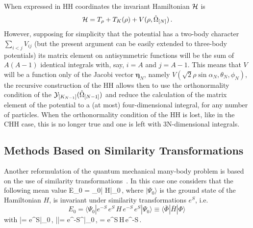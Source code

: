 When expressed in HH coordinates the invariant Hamiltonian $\cal H$ is
\begin{equation}
 {\cal H}=   T_\rho + T_K(\rho) + V(\rho, \hat\Omega_{[N]})\,.
\end{equation}
However, supposing for simplicity that the potential has a two-body character $\sum_{i<j} V_{ij}$
(but the present argument can be easily extended to three-body potentials) its matrix element 
on antisymmetric functions will be the sum of $A(A-1)$ identical integrals 
with, say, $i=A$ and $j=A-1$. This means that $V$  will be a function only of the Jacobi vector $\bm{\eta}_N$, namely
$V(\sqrt{2}\rho \sin \alpha_N, \theta_N,\phi_N)$, 
the recursive  construction of the HH allows then to use the orthonormality condition 
of the ${\cal Y}_{[K_{N-1}]}(\hat\Omega_{[N-1]})$ and reduce the calculation of the matrix element of the potential 
to a (at most) four-dimensional integral, for any number of particles. When the orthonormality condition of the HH is lost, like in the 
CHH case, this is no longer true and one is left with 3N-dimensional integrals.


\subsection{Methods Based on Similarity Transformations~\label{sec:SIM}}
Another reformulation of the quantum mechanical many-body problem is based on the use of similarity
transformations~\cite{Ok54,CoK60,DaS64,SuL80}.
In this case one considers that the following mean value
\be
E_0 = \langle\Psi_0| H|\Psi_0\rangle \,,
\ee
where $|\Psi_0\rangle$ is the ground state  of the Hamiltonian $H$, 
is invariant under similarity transformations $e^S$, i.e.
\begin{equation} 
E_0= \langle\Psi_0|e^{-S} \,e^{S}\, H\,e^{-S} \, e^{S}|\Psi_0\rangle
\equiv \langle \bar\Phi|{\bar H} |\Phi\rangle\label{simileq} \, 
\end{equation}
with  
\be
|\Phi\rangle = e^{S}|\Psi_0\rangle \,, \qquad |\bar\Phi\rangle = e^{-S^\dagger}|\Psi_0\rangle \,,
  = e^{S}\,H\,e^{-S}\,.
\ee 

